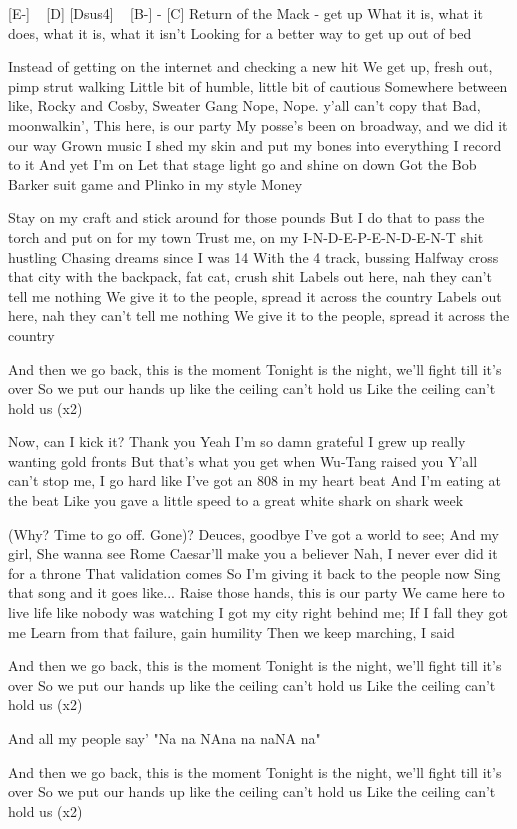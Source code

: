 
[E-] ~ [D] [Dsus4] ~ [B-] - [C]
Return of the Mack - get up
What it is, what it does, what it is, what it isn’t
Looking for a better way to get up out of bed

Instead of getting on the internet and checking a new hit
We get up, fresh out, pimp strut walking
Little bit of humble, little bit of cautious
Somewhere between like, Rocky and Cosby, Sweater Gang
Nope, Nope. y’all can’t copy that
Bad, moonwalkin', This here, is our party
My posse's been on broadway, and we did it our way
Grown music
I shed my skin and put my bones into everything I record to it
And yet I’m on
Let that stage light go and shine on down
Got the Bob Barker suit game and Plinko in my style
Money

Stay on my craft and stick around for those pounds
But I do that to pass the torch and put on for my town
Trust me, on my I-N-D-E-P-E-N-D-E-N-T shit hustling
Chasing dreams since I was 14
With the 4 track, bussing
Halfway cross that city with the backpack, fat cat, crush shit
Labels out here, nah they can’t tell me nothing
We give it to the people, spread it across the country
Labels out here, nah they can’t tell me nothing
We give it to the people, spread it across the country


And then we go back, this is the moment
Tonight is the night, we’ll fight till it’s over
So we put our hands up like the ceiling can’t hold us
Like the ceiling can’t hold us
(x2)


Now, can I kick it? Thank you
Yeah I’m so damn grateful
I grew up really wanting gold fronts
But that’s what you get when Wu-Tang raised you
Y’all can’t stop me, I go hard like I've got an 808 in my heart beat
And I’m eating at the beat
Like you gave a little speed to a great white shark on shark week

(Why? Time to go off. Gone)? Deuces, goodbye
I've got a world to see;
And my girl, She wanna see Rome
Caesar'll make you a believer
Nah, I never ever did it for a throne
That validation comes
So I'm giving it back to the people now
Sing that song and it goes like...
Raise those hands, this is our party
We came here to live life like nobody was watching
I got my city right behind me;
If I fall they got me
Learn from that failure, gain humility
Then we keep marching, I said


And then we go back, this is the moment
Tonight is the night, we’ll fight till it’s over
So we put our hands up like the ceiling can’t hold us
Like the ceiling can’t hold us
(x2)

And all my people say'
"Na na NAna na naNA na"

And then we go back, this is the moment
Tonight is the night, we’ll fight till it’s over
So we put our hands up like the ceiling can’t hold us
Like the ceiling can’t hold us
(x2) 